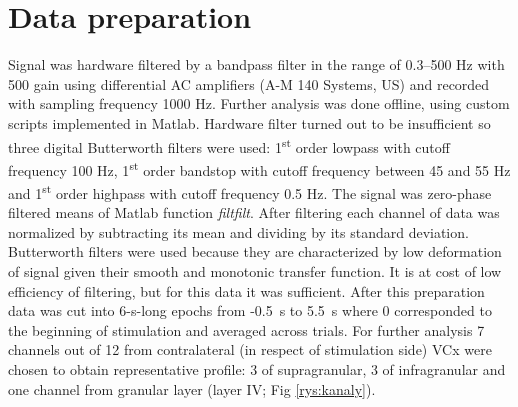 \documentclass{pracalicmgr}
\begin{document}
   \section{Data preparation}
   \label{sec:data_prep}
   Signal was hardware filtered by a bandpass filter in the range of 0.3--500 Hz with 500 gain using differential AC amplifiers (A-M 140 Systems, US) and recorded with sampling frequency 1000 Hz. Further analysis was done offline, using custom scripts implemented in Matlab. Hardware filter turned out to be insufficient so three digital Butterworth filters were used: 1\textsuperscript{st} order lowpass with cutoff frequency 100 Hz,  1\textsuperscript{st} order bandstop with cutoff frequency between 45 and 55 Hz and  1\textsuperscript{st} order highpass with cutoff frequency 0.5 Hz. The signal was zero-phase filtered means of Matlab function \textit{filtfilt}. After filtering each channel of data was normalized by subtracting its mean and dividing by its standard deviation. Butterworth filters were used because they are characterized by low deformation of signal given their smooth and monotonic transfer function. It is at cost of low efficiency of filtering, but for this data it was sufficient. After this preparation data was cut into 6-s-long epochs from -0.5~s to 5.5~s where 0 corresponded to the beginning of stimulation and averaged across trials. For further analysis 7 channels out of 12 from contralateral (in respect of stimulation side) VCx were chosen to obtain representative profile: 3 of supragranular, 3 of infragranular and one channel from granular layer (layer IV; Fig \ref{rys:kanaly}).
   
\end{document}

